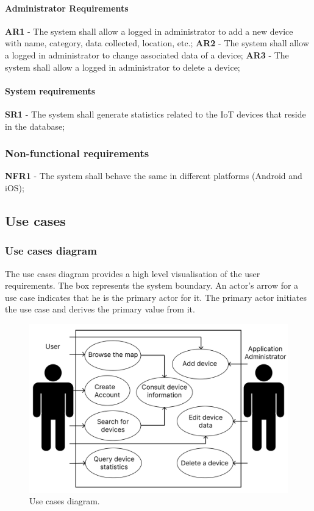 \paragraph*{Administrator Requirements}

\textbf{AR1} - The system shall allow a logged in administrator to add a new device with name, category, data collected, location, etc.;
\newline
\textbf{AR2} - The system shall allow a logged in administrator to change associated data of a device;
\newline
\textbf{AR3} - The system shall allow a logged in administrator to delete a device;

\paragraph*{System requirements}

\textbf{SR1} - The system shall generate statistics related to the IoT devices that reside in the database;

\subsubsection*{Non-functional requirements}

\textbf{NFR1} - The system shall behave the same in different platforms (Android and iOS);

\subsection*{Use cases}

\subsubsection*{Use cases diagram}

The use cases diagram provides a high level visualisation of the user
requirements. The box represents the system boundary. An actor's arrow
for a use case indicates that he is the primary actor for it.
The primary actor initiates the use case and derives the primary value
from it.
\begin{figure}[H]
    \centering
    \includegraphics[width=15cm]{../app/docs/software_requirements/assets/images/use_cases_diagram.png}
    \caption{Use cases diagram.}
    \label{fig:use cases diagram}
\end{figure}

